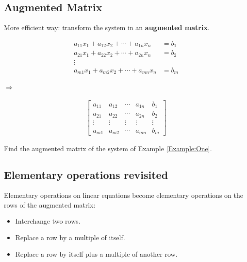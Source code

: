 \documentclass[12pt,a4paper]{article}
\newcounter{example}[section]
\begin{document}
\newpage

\subsection{Augmented Matrix}

More efficient way: transform the system in an \textbf{augmented matrix}.

\begin{minipage}{0.45\textwidth}
\begin{align*}
	a_{11} x_1 + a_{12} x_2 + \cdots + a_{1n} x_n & = b_1 \\
	a_{21} x_1 + a_{22} x_2 + \cdots + a_{2n} x_n & = b_2 \\
	\vdots \phantom{+ + + } & \\
	a_{m1} x_1 + a_{m2} x_2 + \cdots + a_{mn} x_n & = b_m
\end{align*}
\end{minipage}
\begin{minipage}{0.025\textwidth}
{\huge $\Rightarrow$}
\end{minipage}
\begin{minipage}{0.45\textwidth}
\begin{align*}
\begin{bmatrix}
a_{11} & a_{12} & \cdots & a_{1n} & b_1 \\
a_{21} & a_{22} & \cdots & a_{2n} & b_2 \\
\vdots & \vdots & \vdots & \vdots & \vdots \\
a_{m1} & a_{m2} & \cdots & a_{mn} & b_m
\end{bmatrix}
\end{align*}
\end{minipage}

\vspace*{24pt}

\begin{example}
Find the augmented matrix of the system of Example \ref{Example:One}.
\end{example}

\vfill

\subsection{Elementary operations revisited}
Elementary operations on linear equations become elementary operations on the rows of the augmented matrix:
	\begin{itemize}
	\item Interchange two rows.
	\item Replace a row by a multiple of itself.
	\item Replace a row by itself plus a multiple of another row.
	\end{itemize}
\end{document}
